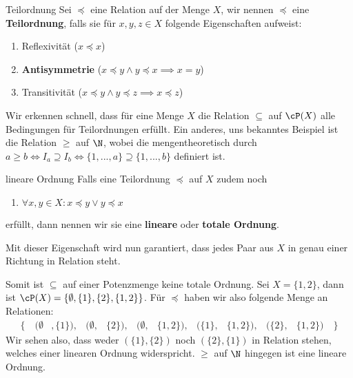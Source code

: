 \begin{definition}{Teilordnung}{}
Sei $\preceq$ eine Relation auf der Menge $X$, wir nennen $\preceq$ eine \textbf{Teilordnung}, falls sie für $x,y,z \in X$ folgende Eigenschaften aufweist:
\begin{enumerate}
    \item Reflexivität ($x \preceq x$)
    \item \textbf{Antisymmetrie} ($x \preceq y \land y \preceq x \implies x = y$)
    \item Transitivität ($x \preceq y \land y \preceq z \implies x \preceq z$)
\end{enumerate}
\end{definition}
\begin{example} \label{ex_partial_order}
Wir erkennen schnell, dass für eine Menge $X$ die Relation $\subseteq$ auf $\cP(X)$ alle Bedingungen für Teilordnungen erfüllt. Ein anderes, uns bekanntes Beispiel ist die Relation $\geq$ auf $\N$, wobei die mengentheoretisch durch $a \geq b \iff I_a \supseteq I_b \iff \{1, ..., a\} \supseteq \{1,...,b\}$ definiert ist. 
\end{example}
\begin{definition}{lineare Ordnung} Falls eine Teilordnung $\preceq$ auf $X$ zudem noch
\begin{enumerate}[resume]
    \item $\forall x,y \in X : x \preceq y \lor y \preceq x$
\end{enumerate}
erfüllt, dann nennen wir sie eine \textbf{lineare} oder \textbf{totale Ordnung}.
\end{definition}
Mit dieser Eigenschaft wird nun garantiert, dass jedes Paar aus $X$ in genau einer Richtung in Relation steht.
\begin{example}
Somit ist $\subseteq$ auf einer Potenzmenge keine totale Ordnung. Sei $X = \{1, 2\}$, dann ist $\cP(X) = \{\emptyset, \{1\}, \{2\}, \{1,2\}\}$. Für $\preceq$ haben wir also folgende Menge an Relationen: 
\begin{align*}
    \big\{\quad (\emptyset&, \{1\}),& (\emptyset,& \{2\}),& (\emptyset,& \{1, 2\}),& (\{1\},& \{1, 2\}),& (\{2\},& \{1, 2\})\quad \big\}
\end{align*}
Wir sehen also, dass weder $(\{1\}, \{2\})$ noch $(\{2\}, \{1\})$ in Relation stehen, welches einer linearen Ordnung widerspricht. $\geq$ auf $\N$ hingegen ist eine lineare Ordnung.
\end{example}

